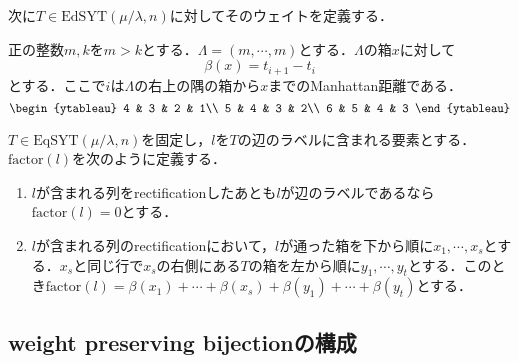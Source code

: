 次に$T\in\text{EdSYT}(\mu/\lambda, n)$に対してそのウェイトを定義する．

\begin{defin}
  正の整数$m, k$を$m>k$とする．$\Lambda=(m,\cdots,m)$とする．$\Lambda$の箱$x$に対して
  \[
  \beta(x)=t_{i+1}-t_i
  \]
  とする．ここで$i$は$\Lambda$の右上の隅の箱から$x$までのManhattan距離である．
  \[
  \begin{ytableau}
    4 & 3 & 2 & 1\\
    5 & 4 & 3 & 2\\
    6 & 5 & 4 & 3
  \end{ytableau}
  \]
\end{defin}

\begin{defin}
  $T\in\text{EqSYT}(\mu/\lambda, n)$を固定し，$l$を$T$の辺のラベルに含まれる要素とする．$\text{factor}(l)$を次のように定義する．
  \begin{enumerate}
    \item $l$が含まれる列をrectificationしたあとも$l$が辺のラベルであるなら$\text{factor}(l)=0$とする．
    \item $l$が含まれる列のrectificationにおいて，$l$が通った箱を下から順に$x_1,\cdots,x_s$とする．$x_s$と同じ行で$x_s$の右側にある$T$の箱を左から順に$y_1,\cdots,y_t$とする．このとき$\text{factor}(l)=\beta(x_1)+\cdots+\beta(x_s)+\beta(y_1)+\cdots+\beta(y_t)$とする．
  \end{enumerate}
\end{defin}






\subsection{weight preserving bijectionの構成}